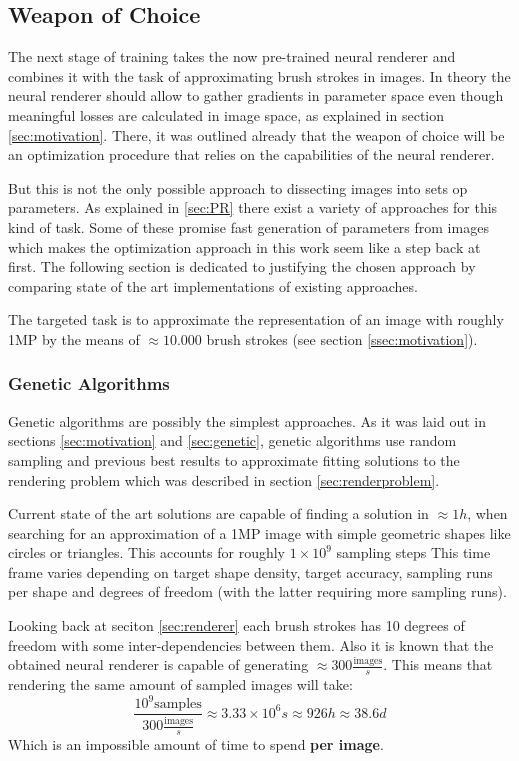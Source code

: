 \subsection{Weapon of Choice}
The next stage of training takes the now pre-trained neural renderer and combines
it with the task of approximating brush strokes in images.
In theory the neural renderer should allow to gather gradients in parameter space
even though meaningful losses are calculated in image space, as explained in section
\ref{sec:motivation}.
There, it was outlined already that the weapon of choice will be an optimization
procedure that relies on the capabilities of the neural renderer.

But this is not the only possible approach to dissecting images into sets op parameters.
As explained in \ref{sec:PR} there exist a variety of approaches for this kind of
task.
Some of these promise fast generation of parameters from images which makes the 
optimization approach in this work seem like a step back at first.
The following section is dedicated to justifying the chosen approach by comparing
state of the art implementations of existing approaches.

The targeted task is to approximate the representation of an image with roughly
1MP by the means of $\approx 10.000$ brush strokes (see section \ref{ssec:motivation}).

\subsubsection{Genetic Algorithms}
Genetic algorithms are possibly the simplest approaches.
As it was laid out in sections \ref{sec:motivation} and \ref{sec:genetic}, genetic
algorithms use random sampling and previous best results to approximate fitting
solutions to the rendering problem which was described in section \ref{sec:renderproblem}.

Current state of the art solutions are capable of finding a solution in $\approx 1h$,
when searching for an approximation of a 1MP image with simple geometric shapes
like circles or triangles.
This accounts for roughly $1 \times 10^{9}$ sampling steps
This time frame varies depending on target shape density, target accuracy, sampling
runs per shape and degrees of freedom (with the latter requiring more sampling runs).

Looking back at seciton \ref{sec:renderer} each brush strokes has 10 degrees of freedom
with some inter-dependencies between them.
Also it is known that the obtained neural renderer is capable of generating $\approx
300 \frac{\text{images}}{s}$.
This means that rendering the same amount of sampled images will take:
$$
\frac{10^{9} \text{samples}}{300 \frac{\text{images}}{s}} \approx 3.33 \times 10^{6} s
\approx 926 h \approx 38.6 d
$$
Which is an impossible amount of time to spend \textbf{per image}.

